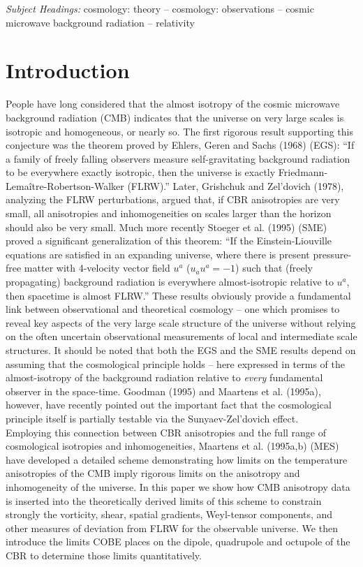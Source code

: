 \noindent
{\it Subject Headings:} cosmology: theory -- cosmology: observations --
cosmic microwave background radiation -- relativity \\

\section{Introduction}

People have long considered that the almost isotropy of the cosmic microwave
background radiation (CMB) indicates that the universe on very large scales is
isotropic and homogeneous, or nearly so. The first rigorous result supporting
this conjecture was the theorem proved by Ehlers, Geren and Sachs (1968) (EGS):
``If
a family of freely falling observers measure self-gravitating background
radiation to be everywhere exactly isotropic, then the universe is exactly
Friedmann-Lema\^{i}tre-Robertson-Walker (FLRW).'' Later, Grishchuk and
Zel'dovich (1978), analyzing the FLRW perturbations, argued that, if CBR
anisotropies are very small, all anisotropies and inhomogeneities on scales
larger than the horizon should also be very small. Much more recently Stoeger
et al. (1995) (SME)  proved a significant generalization of this theorem:
``If the
Einstein-Liouville equations are satisfied in an expanding universe, where 
there is present pressure-free matter with 4-velocity vector field $u^a$
($u_au^a = -1$) such that (freely propagating) background radiation is
everywhere almost-isotropic relative to $u^a$, then spacetime is almost
FLRW.'' These results obviously provide a fundamental link between observational
and theoretical cosmology -- one which promises to reveal key aspects of the
very
large scale
structure of the universe without relying on the often uncertain observational
measurements of local and intermediate scale structures. It should be noted
that both the EGS and the SME results depend on assuming that the cosmological
principle holds -- here expressed in terms of the almost-isotropy of the
background radiation relative to {\it every} fundamental observer in the
space-time. Goodman (1995) and Maartens et al. (1995a), however, have recently
pointed
out the important fact that
the cosmological principle itself is partially testable via the
Sunyaev-Zel'dovich effect. \\

Employing this connection between CBR anisotropies and the full range of
cosmological isotropies and inhomogeneities, Maartens et al. (1995a,b) (MES)
have
developed a
detailed
scheme demonstrating how limits on the temperature anisotropies of the
CMB imply rigorous limits on the anisotropy and inhomogeneity of the
universe. In this paper we show how CMB anisotropy data is inserted into
the theoretically derived limits of this scheme to constrain strongly the
vorticity, shear, spatial gradients, Weyl-tensor components, and other
measures of deviation from FLRW for the observable universe. We then introduce
the limits
COBE places on the dipole, quadrupole and octupole of the CBR to determine
those limits quantitatively. \\

